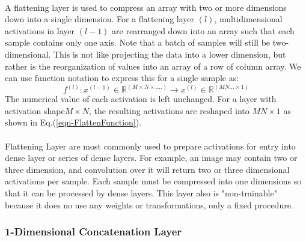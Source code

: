 \documentclass[12pt,letterpaper]{article}
\begin{document}
\paragraph*{}A flattening layer is used to compress an array with two or more dimensions down into a single dimension. For a flattening layer $(l)$, multidimensional activations in layer $(l-1)$ are rearranged down into an array such that each sample contains only one axis. Note that a batch of samples will still be two-dimensional. This is not like projecting the data into a lower dimension, but rather is the reorganization of values into an array of a row of column array. We can use function notation to express this for a single sample as:
\begin{equation}
\label{eqn-FlattenFunction}
f^{(l)} : x^{(l-1)} \in \mathbb{R}^{(M \times N \times ....)} \rightarrow
x^{(l)} \in \mathbb{R}^{(MN...\times 1)}
\end{equation}
The numerical value of each activation is left unchanged. For a layer with activation shape$M \times N$, the resulting activations are reshaped into $MN \times 1$ as shown in Eq.(\ref{eqn-FlattenFunction}).

\paragraph*{}Flattening Layer are most commonly used to prepare activations for entry into dense layer or series of dense layers. For example, an image may contain two or three dimension, and convolution over it will return two or three dimensional activations per sample. Each sample must be compressed into one dimensions so that it can be processed by dense layers. This layer also is "non-trainable" because it does no use any weights or transformations, only a fixed procedure.


\subsubsection{1-Dimensional Concatenation Layer}
\label{subsubsec-1DConcat}
\end{document}

